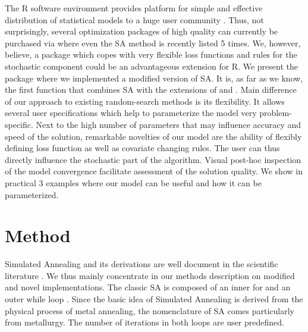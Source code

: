The R software environment provides platform for simple and effective distribution of statistical models to a huge user community \citep{xiang_2013}. Thus, not surprisingly, several optimization packages of high quality can currently be purchased via  \citep{theussl_2016} where even the SA method is recently listed 5 times. We, however, believe, a package which copes with very flexible loss functions and rules for the stochastic component could be an advantageous extension for R. We present the package  where we implemented a modified version of SA. It is, as far as we know, the first function that combines SA with the extensions of \citet{corana_1987} and \citet{pronzato_1984}. Main difference of our approach to existing random-search methods is its flexibility. It allows several user specifications which help to parameterize the model very problem-specific. Next to the high number of parameters that may influence accuracy and speed of the solution, remarkable novelties of our model are the ability of flexibly defining loss function as well as covariate changing rules. The user can thus directly influence the stochastic part of the algorithm. Visual post-hoc inspection of the model convergence facilitate assessment of the solution quality. We show in practical 3 examples where our model can be useful and how it can be parameterized.\\

\section{Method}
Simulated Annealing and its derivations are well document in the scientific literature \citep[e. g. in][]{hansen_2012,kirkpatrick_1983, xiang_2013}. We thus mainly concentrate in our methods description on modified and novel implementations. The classic SA is composed of an inner for and an outer while loop \citep{kirkpatrick_1983}. Since the basic idea of Simulated Annealing is derived from the physical process of metal annealing, the nomenclature of SA comes particularly from metallurgy. The number of iterations in both loops are user predefined.\\

